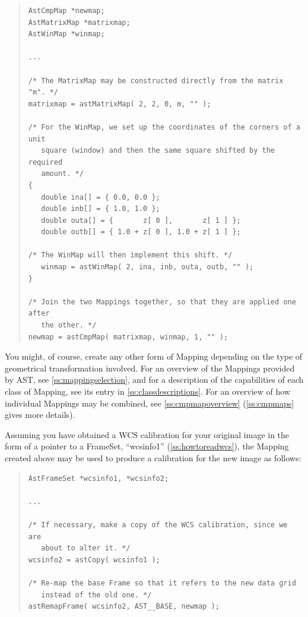 \documentclass[twoside,11pt]{article}
\newcommand{\htmlref}[2]{#1}
\newcommand{\appref}[1]{Appendix~\ref{#1}}
\newcommand{\secref}[1]{\S\ref{#1}}
\renewcommand{\appref}[1]{\ref{#1}}
\renewcommand{\secref}[1]{\ref{#1}}
\begin{document}
\begin{quote}
\small
\begin{verbatim}
AstCmpMap *newmap;
AstMatrixMap *matrixmap;
AstWinMap *winmap;

...

/* The MatrixMap may be constructed directly from the matrix "m". */
matrixmap = astMatrixMap( 2, 2, 0, m, "" );

/* For the WinMap, we set up the coordinates of the corners of a unit
   square (window) and then the same square shifted by the required
   amount. */
{
   double ina[] = { 0.0, 0.0 };
   double inb[] = { 1.0, 1.0 };
   double outa[] = {       z[ 0 ],       z[ 1 ] };
   double outb[] = { 1.0 + z[ 0 ], 1.0 + z[ 1 ] };

/* The WinMap will then implement this shift. */
   winmap = astWinMap( 2, ina, inb, outa, outb, "" );
}

/* Join the two Mappings together, so that they are applied one after
   the other. */
newmap = astCmpMap( matrixmap, winmap, 1, "" );
\end{verbatim}
\normalsize
\end{quote}

You might, of course, create any other form of Mapping depending on
the type of geometrical transformation involved. For an overview of
the Mappings provided by AST, see \secref{ss:mappingselection}, and
for a description of the capabilities of each class of Mapping, see
its entry in \appref{ss:classdescriptions}. For an overview of how
individual Mappings may be combined, see \secref{ss:cmpmapoverview}
(\secref{ss:cmpmaps} gives more details).

Assuming you have obtained a WCS calibration for your original image
in the form of a pointer to a \htmlref{FrameSet}{FrameSet}, ``wcsinfo1''
(\secref{ss:howtoreadwcs}), the Mapping created above may be used to
produce a calibration for the new image as follows:

\begin{quote}
\small
\begin{verbatim}
AstFrameSet *wcsinfo1, *wcsinfo2;

...

/* If necessary, make a copy of the WCS calibration, since we are
   about to alter it. */
wcsinfo2 = astCopy( wcsinfo1 );

/* Re-map the base Frame so that it refers to the new data grid
   instead of the old one. */
astRemapFrame( wcsinfo2, AST__BASE, newmap );
\end{verbatim}
\normalsize
\end{quote}
\end{document}
